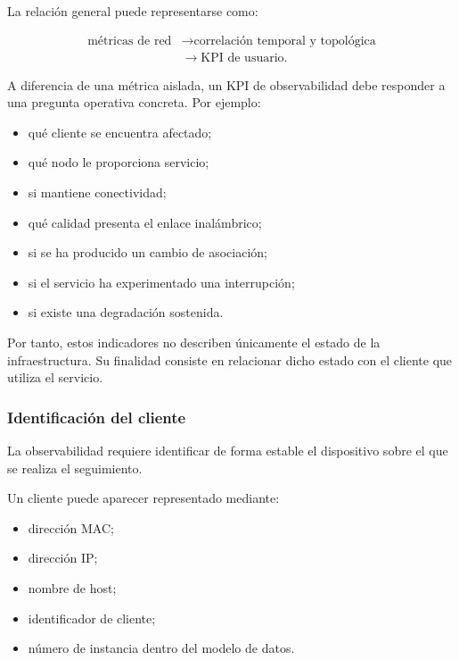 La relación general puede representarse como:

\[
\begin{aligned}
    \text{métricas de red}
    &\longrightarrow
    \text{correlación temporal y topológica}\\
    &\longrightarrow
    \text{KPI de usuario}.
\end{aligned}
\]

A diferencia de una métrica aislada, un KPI de observabilidad debe
responder a una pregunta operativa concreta. Por ejemplo:

\begin{itemize}
    \item qué cliente se encuentra afectado;

    \item qué nodo le proporciona servicio;

    \item si mantiene conectividad;

    \item qué calidad presenta el enlace inalámbrico;

    \item si se ha producido un cambio de asociación;

    \item si el servicio ha experimentado una interrupción;

    \item si existe una degradación sostenida.
\end{itemize}

Por tanto, estos indicadores no describen únicamente el estado de la
infraestructura. Su finalidad consiste en relacionar dicho estado con el
cliente que utiliza el servicio.


\subsubsection*{Identificación del cliente}

La observabilidad requiere identificar de forma estable el dispositivo
sobre el que se realiza el seguimiento.

Un cliente puede aparecer representado mediante:

\begin{itemize}
    \item dirección MAC;

    \item dirección IP;

    \item nombre de host;

    \item identificador de cliente;

    \item número de instancia dentro del modelo de datos.
\end{itemize}

